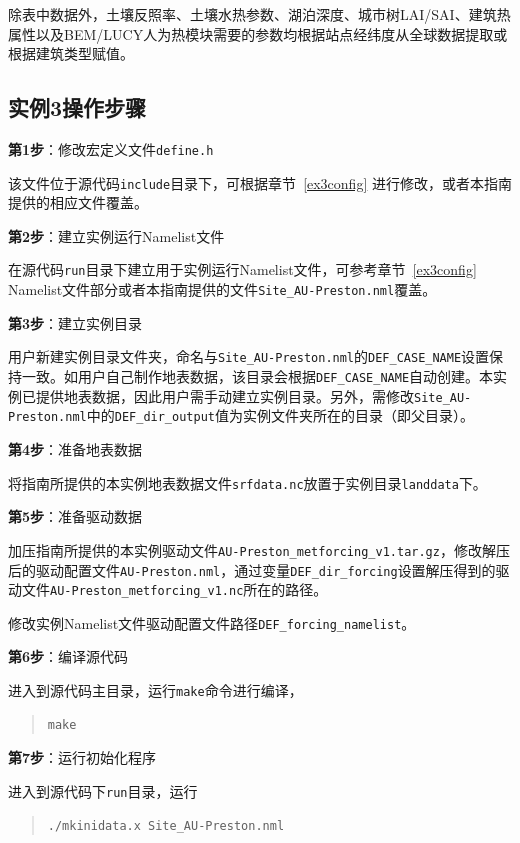 除表中数据外，土壤反照率、土壤水热参数、湖泊深度、城市树LAI/SAI、建筑热属性以及BEM/LUCY人为热模块需要的参数均根据站点经纬度从全球数据提取或根据建筑类型赋值。

\subsection{实例3操作步骤}

\textbf{第1步}：修改宏定义文件\texttt{define.h}

该文件位于源代码\texttt{include}目录下，可根据章节~\ref{ex3config} 进行修改，或者本指南提供的相应文件覆盖。

\bigskip
\textbf{第2步}：建立实例运行Namelist文件

在源代码\texttt{run}目录下建立用于实例运行Namelist文件，可参考章节~\ref{ex3config} Namelist文件部分或者本指南提供的文件\texttt{Site\_AU-Preston.nml}覆盖。

\bigskip
\textbf{第3步}：建立实例目录

用户新建实例目录文件夹，命名与\texttt{Site\_AU-Preston.nml}的\texttt{DEF\_CASE\_NAME}设置保持一致。如用户自己制作地表数据，该目录会根据\texttt{DEF\_CASE\_NAME}自动创建。本实例已提供地表数据，因此用户需手动建立实例目录。另外，需修改\texttt{Site\_AU-Preston.nml}中的\texttt{DEF\_dir\_output}值为实例文件夹所在的目录（即父目录）。

\bigskip
\textbf{第4步}：准备地表数据

将指南所提供的本实例地表数据文件\texttt{srfdata.nc}放置于实例目录\texttt{landdata}下。

\bigskip
\textbf{第5步}：准备驱动数据

加压指南所提供的本实例驱动文件\texttt{AU-Preston\_metforcing\_v1.tar.gz}，修改解压后的驱动配置文件\texttt{AU-Preston.nml}，通过变量\texttt{DEF\_dir\_forcing}设置解压得到的驱动文件\texttt{AU-Preston\_metforcing\_v1.nc}所在的路径。

修改实例Namelist文件驱动配置文件路径\texttt{DEF\_forcing\_namelist}。

\bigskip
\textbf{第6步}：编译源代码

进入到源代码主目录，运行\texttt{make}命令进行编译，
\begin{quote}
\begin{lstlisting}
make
\end{lstlisting}
\end{quote}

\bigskip
\textbf{第7步}：运行初始化程序

进入到源代码下\texttt{run}目录，运行
\begin{quote}
\begin{lstlisting}
./mkinidata.x Site_AU-Preston.nml
\end{lstlisting}
\end{quote}

